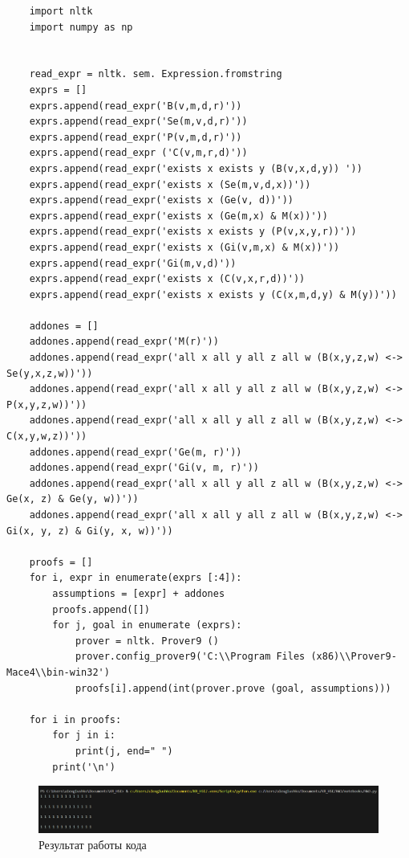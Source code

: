 \documentclass[a4paper,14pt]{article} %
\begin{document}
\begin{lstlisting}
    import nltk
    import numpy as np


    read_expr = nltk. sem. Expression.fromstring
    exprs = []
    exprs.append(read_expr('B(v,m,d,r)'))
    exprs.append(read_expr('Se(m,v,d,r)'))
    exprs.append(read_expr('P(v,m,d,r)'))
    exprs.append(read_expr ('C(v,m,r,d)'))
    exprs.append(read_expr('exists x exists y (B(v,x,d,y)) '))
    exprs.append(read_expr('exists x (Se(m,v,d,x))'))
    exprs.append(read_expr('exists x (Ge(v, d))'))
    exprs.append(read_expr('exists x (Ge(m,x) & M(x))'))
    exprs.append(read_expr('exists x exists y (P(v,x,y,r))'))
    exprs.append(read_expr('exists x (Gi(v,m,x) & M(x))'))
    exprs.append(read_expr('Gi(m,v,d)'))
    exprs.append(read_expr('exists x (C(v,x,r,d))'))
    exprs.append(read_expr('exists x exists y (C(x,m,d,y) & M(y))'))

    addones = []
    addones.append(read_expr('M(r)'))
    addones.append(read_expr('all x all y all z all w (B(x,y,z,w) <-> Se(y,x,z,w))'))
    addones.append(read_expr('all x all y all z all w (B(x,y,z,w) <-> P(x,y,z,w))'))
    addones.append(read_expr('all x all y all z all w (B(x,y,z,w) <-> C(x,y,w,z))'))
    addones.append(read_expr('Ge(m, r)'))
    addones.append(read_expr('Gi(v, m, r)'))
    addones.append(read_expr('all x all y all z all w (B(x,y,z,w) <-> Ge(x, z) & Ge(y, w))'))
    addones.append(read_expr('all x all y all z all w (B(x,y,z,w) <-> Gi(x, y, z) & Gi(y, x, w))'))

    proofs = []
    for i, expr in enumerate(exprs [:4]):
        assumptions = [expr] + addones
        proofs.append([])
        for j, goal in enumerate (exprs):
            prover = nltk. Prover9 ()
            prover.config_prover9('C:\\Program Files (x86)\\Prover9-Mace4\\bin-win32')
            proofs[i].append(int(prover.prove (goal, assumptions)))

    for i in proofs:
        for j in i:
            print(j, end=" ")
        print('\n')
\end{lstlisting}

\begin{figure}[h!]
    \centering
    \includegraphics[width=\linewidth]{pictures/run_script.png}
    \caption{Результат работы кода}
    \label{fig:res}
\end{figure}
\end{document}
